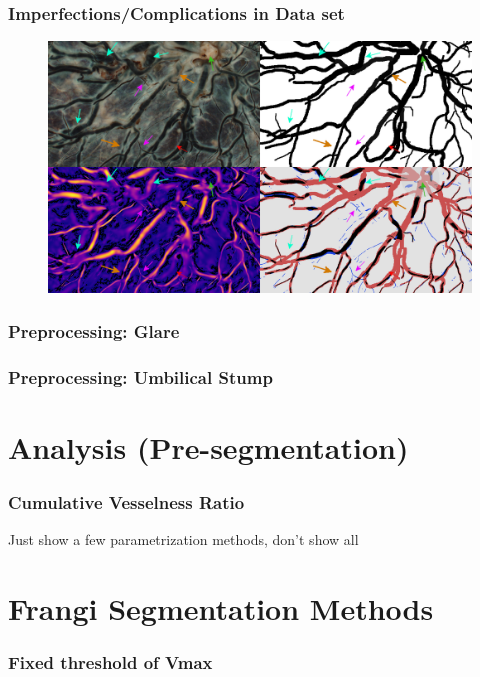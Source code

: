 \documentclass[9pt,notes]{beamer}
\begin{document}
\begin{frame}
\frametitle{Imperfections/Complications in Data set}
\begin{figure}
  \includegraphics[width=\textwidth]{annotations-montage-2by2}
\end{figure}
\end{frame}

\begin{frame}
\frametitle{Preprocessing: Glare}
\end{frame}

\begin{frame}
\frametitle{Preprocessing: Umbilical Stump}
\end{frame}

\section{Analysis (Pre-segmentation)}

\begin{frame}
\frametitle{Cumulative Vesselness Ratio}
Just show a few parametrization methods, don't show all
\end{frame}

\section{Frangi Segmentation Methods}
\begin{frame}
\frametitle{Fixed threshold of Vmax}
\end{frame}
\end{document}
